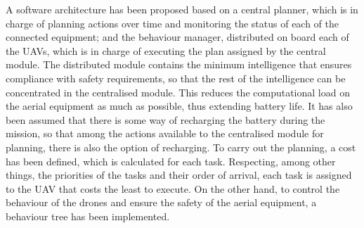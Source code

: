 A software architecture has been proposed based on a central planner, which is in charge of planning actions over time and monitoring the status of each of the connected equipment; and the behaviour manager, distributed on board each of the UAVs, which is in charge of executing the plan assigned by the central module. The distributed module contains the minimum intelligence that ensures compliance with safety requirements, so that the rest of the intelligence can be concentrated in the centralised module. This reduces the computational load on the aerial equipment as much as possible, thus extending battery life. It has also been assumed that there is some way of recharging the battery during the mission, so that among the actions available to the centralised module for planning, there is also the option of recharging. To carry out the planning, a cost has been defined, which is calculated for each task. Respecting, among other things, the priorities of the tasks and their order of arrival, each task is assigned to the \gls{UAV} that costs the least to execute. On the other hand, to control the behaviour of the drones and ensure the safety of the aerial equipment, a behaviour tree has been implemented.

